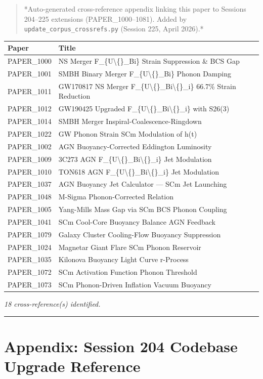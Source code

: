 \documentclass[11pt]{article}
\begin{document}
\begin{quote}
*Auto-generated cross-reference appendix linking this paper to
Sessions 204--225 extensions (PAPER\_1000--1081). Added by
\verb|update_corpus_crossrefs.py| (Session 225, April 2026).*
\end{quote}

\begin{center}
\begin{longtable}{ll}
\toprule
Paper & Title \tabularnewline
\midrule
\endhead
PAPER\_1000 & NS Merger F\_\{U\textbackslash\{\}\_Bi\} Strain Suppression \& BCS Gap \tabularnewline
PAPER\_1001 & SMBH Binary Merger F\_\{U\textbackslash\{\}\_Bi\} Phonon Damping \tabularnewline
PAPER\_1011 & GW170817 NS Merger F\_\{U\textbackslash\{\}\_Bi\textbackslash\{\}\_i\} 66.7\% Strain Reduction \tabularnewline
PAPER\_1012 & GW190425 Upgraded F\_\{U\textbackslash\{\}\_Bi\textbackslash\{\}\_i\} with S26(3) \tabularnewline
PAPER\_1014 & SMBH Merger Inspiral-Coalescence-Ringdown \tabularnewline
PAPER\_1022 & GW Phonon Strain SCm Modulation of h(t) \tabularnewline
PAPER\_1002 & AGN Buoyancy-Corrected Eddington Luminosity \tabularnewline
PAPER\_1009 & 3C273 AGN F\_\{U\textbackslash\{\}\_Bi\textbackslash\{\}\_i\} Jet Modulation \tabularnewline
PAPER\_1010 & TON618 AGN F\_\{U\textbackslash\{\}\_Bi\textbackslash\{\}\_i\} Jet Modulation \tabularnewline
PAPER\_1037 & AGN Buoyancy Jet Calculator --- SCm Jet Launching \tabularnewline
PAPER\_1048 & M-Sigma Phonon-Corrected Relation \tabularnewline
PAPER\_1005 & Yang-Mills Mass Gap via SCm BCS Phonon Coupling \tabularnewline
PAPER\_1041 & SCm Cool-Core Buoyancy Balance AGN Feedback \tabularnewline
PAPER\_1079 & Galaxy Cluster Cooling-Flow Buoyancy Suppression \tabularnewline
PAPER\_1024 & Magnetar Giant Flare SCm Phonon Reservoir \tabularnewline
PAPER\_1035 & Kilonova Buoyancy Light Curve r-Process \tabularnewline
PAPER\_1072 & SCm Activation Function Phonon Threshold \tabularnewline
PAPER\_1073 & SCm Phonon-Driven Inflation Vacuum Buoyancy \tabularnewline
\bottomrule
\end{longtable}
\end{center}

\emph{18 cross-reference(s) identified.}

\noindent\rule{\textwidth}{0.4pt}

\section*{Appendix: Session 204 Codebase Upgrade Reference}
\end{document}
